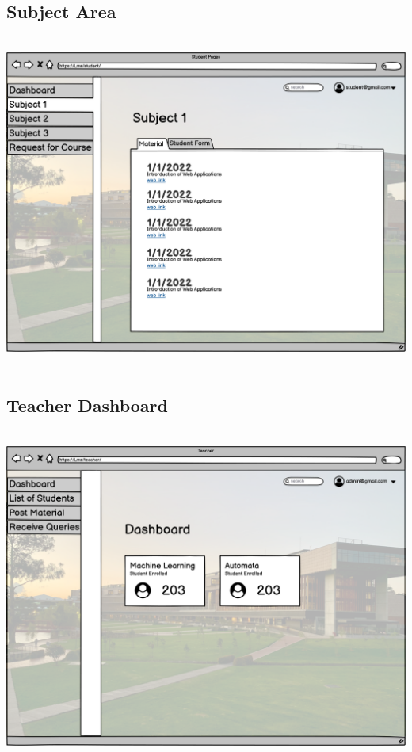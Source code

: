 \subsection{Subject Area}

\includegraphics[width=18cm, height=11cm]{HW_1/images/Subject 1 student.png}

\subsection{Teacher Dashboard}

\includegraphics[width=18cm, height=11cm]{HW_1/images/Teacher Deshboard.png}

